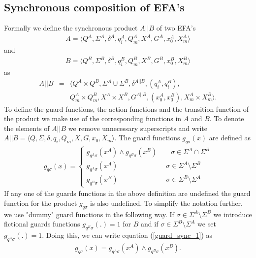 \documentclass{article}
\begin{document}
\subsection{Synchronous composition of EFA's}

Formally we define the synchronous product $A||B$ of two EFA's
\begin{eqnarray}
A=\langle Q^A, \Sigma^A, \delta^A, q^A_i, Q^A_m, X^{A},
G^A,x^A_0,X^A_m \rangle
\end{eqnarray} and \begin{eqnarray} B=\langle Q^B, \Sigma^B, \delta^B, q^B_i,
Q^B_m, X^{B}, G^B,x^B_0,X^B_m \rangle
\end{eqnarray} as
\begin{eqnarray}
A||B&=&\langle Q^A\times Q^B, \Sigma^A \cup \Sigma^B ,
\delta^{A||B}, (q^A_i,q^B_i) ,\nonumber\\
&& Q^A_m\times Q^B_m, X^A \times X^B, G^{A||B},(x^A_0,x^B_0),
X^A_m \times X^B_m \rangle.
\end{eqnarray}
To define the guard functions, the action functions and the
transition function of the product we make use of the
corresponding functions in $A$ and $B$. To denote the elements of
$A||B$ we remove unnecessary  superscripts and write $A||B=\langle
Q, \Sigma, \delta, q_i, Q_m, X, G ,x_0, X_m \rangle$. The guard
functions $g_{q \sigma}(x)$ are defined as
\begin{eqnarray}\label{guard_sync_1}
g_{q \sigma}(x)=\left\{
\begin{array}{ll}
g_{q^A\sigma}(x^{A})\wedge g_{q^B\sigma}(x^{B}) \quad\quad\sigma\in \Sigma^A \cap \Sigma^B\\
g_{q^A\sigma}(x^{A})\quad\quad\quad\quad\quad\quad\quad\sigma\in \Sigma^A\setminus\Sigma^B\\
g_{q^B\sigma}(x^{B})\quad\quad\quad\quad\quad\quad\quad\sigma\in\Sigma^B\setminus\Sigma^A
\end{array}\right.
\end{eqnarray}
If any one of the guards functions in the above definition are
undefined the guard function for the product $g_{q \sigma}$ is
also undefined. To simplify the notation further, we use "dummy"
guard functions in the following way. If $\sigma\in \Sigma^A
\setminus \Sigma^B$ we introduce fictional guards functions
$g_{q^B\sigma}(.)=1$ for $B$ and if $\sigma\in\Sigma^B\setminus
\Sigma^A$ we set $g_{q^A\sigma}(.)=1$. Doing this, we can write
equation (\ref{guard_sync_1}) as
\begin{eqnarray}
g_{q \sigma}(x)= g_{q^A\sigma}(x^{A})\wedge g_{q^B\sigma}(x^{B}).
\end{eqnarray}
\end{document}
